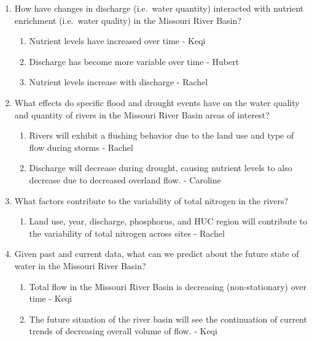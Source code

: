 \documentclass[12pt,]{article}
\providecommand{\tightlist}{%
  \setlength{\itemsep}{0pt}\setlength{\parskip}{0pt}}
\begin{document}
\begin{enumerate}
\def\labelenumi{\arabic{enumi}.}
\item
  How have changes in discharge (i.e.~water quantity) interacted with
  nutrient enrichment (i.e.~water quality) in the Missouri River Basin?

  \begin{enumerate}
  \def\labelenumii{\alph{enumii})}
  \tightlist
  \item
    Nutrient levels have increased over time - Keqi
  \item
    Discharge has become more variable over time - Hubert
  \item
    Nutrient levels increase with discharge - Rachel
  \end{enumerate}
\item
  What effects do specific flood and drought events have on the water
  quality and quantity of rivers in the Missouri River Basin areas of
  interest?

  \begin{enumerate}
  \def\labelenumii{\alph{enumii})}
  \tightlist
  \item
    Rivers will exhibit a flushing behavior due to the land use and type
    of flow during storms - Rachel
  \item
    Discharge will decrease during drought, causing nutrient levels to
    also decrease due to decreased overland flow. - Caroline
  \end{enumerate}
\item
  What factors contribute to the variability of total nitrogen in the
  rivers?

  \begin{enumerate}
  \def\labelenumii{\alph{enumii})}
  \tightlist
  \item
    Land use, year, discharge, phosphorus, and HUC region will
    contribute to the variability of total nitrogen across sites -
    Rachel
  \end{enumerate}
\item
  Given past and current data, what can we predict about the future
  state of water in the Missouri River Basin?

  \begin{enumerate}
  \def\labelenumii{\alph{enumii})}
  \tightlist
  \item
    Total flow in the Missouri River Basin is decreasing
    (non-stationary) over time - Keqi
  \item
    The future situation of the river basin will see the continuation of
    current trends of decreasing overall volume of flow. - Keqi
  \end{enumerate}
\end{enumerate}
\end{document}
